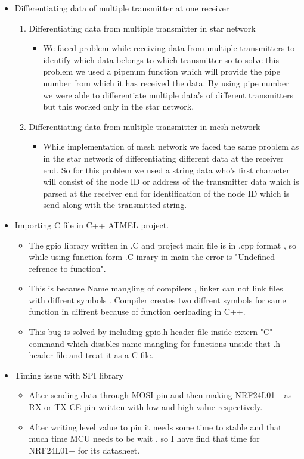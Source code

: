 \documentclass[a4paper,12pt,oneside]{book}
\begin{document}
\begin{itemize}
        \item Differentiating data of multiple transmitter at one receiver
        \begin{enumerate}
        \item Differentiating data from multiple transmitter in star network
        \begin{itemize}
        \item We faced problem while receiving data from multiple transmitters to identify which data belongs to which transmitter so to solve this problem we used a pipenum function which will provide the pipe number from which it has received the data. By using pipe number we were able to differentiate multiple data's of different transmitters but this worked only in the star network.
        \end{itemize}
        \item Differentiating data from multiple transmitter in mesh network
        \begin{itemize}
        \item While implementation of mesh network we faced the same problem as in the star network of differentiating different data at the receiver end. So for this problem we used a string data who's first character will consist of the node ID or address of the transmitter data which is parsed at the receiver end for identification of the node ID which is send along with the transmitted string.
        \end{itemize}
        \end{enumerate}
		\item Importing C file in C++ ATMEL project.
        \begin{itemize}
        \item The gpio library written in .C and project main file is in .cpp format , so while using function form .C inrary in main the error is "Undefined refrence to function".
       \item This is because Name mangling of compilers , linker can not link files with diffrent symbols . Compiler creates two diffrent symbols for same function in diffrent because of function oerloading in C++.
       \item This bug is solved by including gpio.h header file inside extern "C" command which disables name mangling for functions unside that .h header file and treat it as a C file.
        
        \end{itemize}
        \item Timing issue with SPI library
        \begin{itemize}
        \item After sending data through MOSI pin and then making NRF24L01+ as RX or TX  CE pin written with low and high value respectively.
        \item After writing level value to pin it needs some time to stable and that much time MCU needs to be wait . so I have find that time for NRF24L01+ for its datasheet.
        \end{itemize}
        

\end{itemize}
\end{document}
